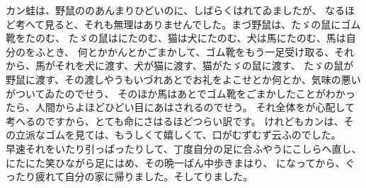 \documentclass[
a4paper,
10pt,
book]
{tarticle}
\begin{document}
\newpage
\setcounter{page}{7}
\thispagestyle{fancy}
\begin{linenumbers}
    \indent カン蛙は、野鼠ののあんまりひどいのに、しばらくはれてゐましたが、
    なるほど考へて見ると、それも無理はありませんでした。まづ野鼠は、たゞの鼠にゴム靴をたのむ、
    たゞの鼠はにたのむ、猫は犬にたのむ、犬は馬にたのむ、馬は自分のをふとき、
    何とかかんとかごまかして、ゴム靴をもう一足受け取る、それから、馬がそれを犬に渡す、犬が猫に渡す、猫がたゞの鼠に渡す、
    たゞの鼠が野鼠に渡す、その渡しやうもいづれあとでお礼をよこせとか何とか、気味の悪いがついてゐたのでせう、
    そのほか馬はあとでゴム靴をごまかしたことがわかったら、人間からよほどひどい目にあはされるのでせう。
    それ全体をが心配して考へるのですから、とても命にさはるほどつらい訳です。
    けれどもカンは、その立派なゴムを見ては、もうしくて嬉しくて、口がむずむず云ふのでした。\\
    \indent 早速それをいたり引っぱったりして、丁度自分の足に合ふやうにこしらへ直し、にたにた笑ひながら足にはめ、その晩一ばん中歩きまはり、
    になってから、ぐったり疲れて自分の家に帰りました。そしてりました。
\end{linenumbers}
\end{document}
